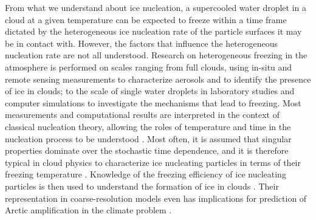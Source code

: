 \documentclass[journal abbreviation, manuscript]{copernicus}
\begin{document}
From what we understand about ice nucleation, a supercooled water droplet in a cloud at a given temperature can be expected to freeze within a time frame dictated by the heterogeneous ice nucleation rate of the particle surfaces it may be in contact with. However, the factors that influence the heterogeneous nucleation rate are not all understood. Research on heterogeneous freezing in the atmosphere is performed on scales ranging from full clouds, using in-situ and remote sensing measurements to characterize aerosols and to identify the presence of ice in clouds; to the scale of single water droplets in laboratory studies and computer simulations to investigate the mechanisms that lead to freezing. Most measurements and computational results are interpreted in the context of classical nucleation theory, allowing the roles of temperature and time in the nucleation process to be understood \citep[e.g.,][]{niedermeier2011heterogeneous}. Most often, it is assumed that singular properties dominate over the stochastic time dependence, and it is therefore typical in cloud physics to characterize ice nucleating particles in terms of their freezing temperature \citep[e.g.,][]{hoose2012heterogeneous,frostenberg2022chance}. Knowledge of the freezing efficiency of ice nucleating particles is then used to understand the formation of ice in clouds \citep[e.g.,][]{yang2013minimalist,fu2017effect}. Their representation in coarse-resolution models even has implications for prediction of Arctic amplification in the climate problem \citep{tan2022potential}. 
\end{document}
